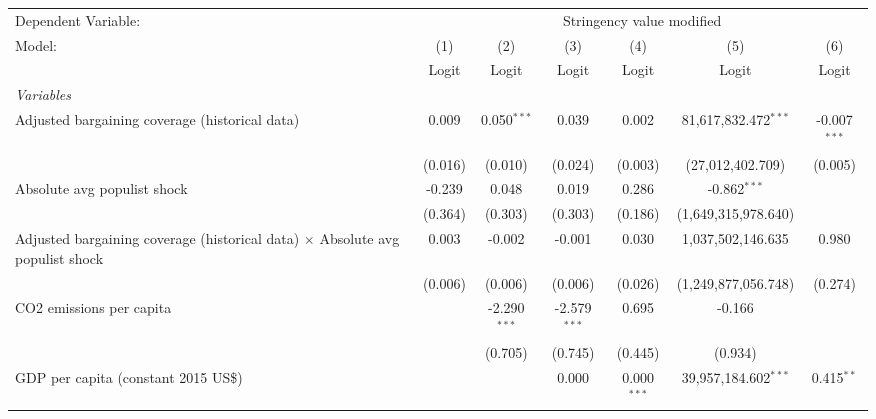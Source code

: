 
\begingroup
\centering
\begin{tabular}{lcccccc}
   \toprule
   Dependent Variable: & \multicolumn{6}{c}{Stringency value modified}\\
   Model:                                                                               & (1)     & (2)            & (3)            & (4)             & (5)                    & (6)\\  
                                                                                        &  Logit  & Logit          & Logit          & Logit           & Logit                  & Logit\\  
   \midrule
   \emph{Variables}\\
   Adjusted bargaining coverage (historical data)                                       & 0.009   & 0.050$^{***}$  & 0.039          & 0.002           & 81,617,832.472$^{***}$ & -0.007$^{***}$\\   
                                                                                        & (0.016) & (0.010)        & (0.024)        & (0.003)         & (27,012,402.709)       & (0.005)\\   
   Absolute avg populist shock                                                          & -0.239  & 0.048          & 0.019          & 0.286           & -0.862$^{***}$         &   \\   
                                                                                        & (0.364) & (0.303)        & (0.303)        & (0.186)         & (1,649,315,978.640)    &   \\   
   Adjusted bargaining coverage (historical data) $\times$ Absolute avg populist shock  & 0.003   & -0.002         & -0.001         & 0.030           & 1,037,502,146.635      & 0.980\\   
                                                                                        & (0.006) & (0.006)        & (0.006)        & (0.026)         & (1,249,877,056.748)    & (0.274)\\   
   CO2 emissions per capita                                                             &         & -2.290$^{***}$ & -2.579$^{***}$ & 0.695           & -0.166                 &   \\   
                                                                                        &         & (0.705)        & (0.745)        & (0.445)         & (0.934)                &   \\   
   GDP per capita (constant 2015 US\$)                                                  &         &                & 0.000          & 0.000$^{***}$   & 39,957,184.602$^{***}$ & 0.415$^{**}$\\   

\end{tabular}
